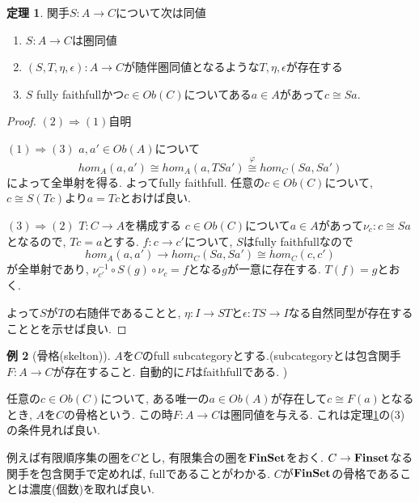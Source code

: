 \documentclass[dvipdfmx,a4paper,11pt]{article}
\theoremstyle{definition}
\newtheorem{thm}{定理}
\newtheorem{exa}[thm]{例}
\begin{document}
 \begin{tcolorbox}
 [colback = white, colframe = green!35!black, fonttitle = \bfseries,breakable = true]
\begin{thm}
\label{thm-adjoint-equiv}
関手$S : A \to C$について次は同値
\begin{enumerate}
\item $S : A \to C$は圏同値
\item $(S,T,\eta,\epsilon): A\to C$が随伴圏同値となるような$T,\eta,\epsilon$が存在する
\item $S$ fully faithfullかつ$c \in Ob(C)$についてある$a \in A$があって$c \cong Sa$.
\end{enumerate}
\end{thm}
\end{tcolorbox}
\begin{proof}
$(2) \Rightarrow (1)$自明

$(1) \Rightarrow (3)$
$a, a' \in Ob(A)$について
$$
hom_{A}(a, a') \cong hom_{A}(a ,TSa') \overset{\varphi}{\cong} hom_{C}(Sa, Sa') 
$$
によって全単射を得る. よってfully faithfull.
任意の$c \in Ob(C)$について, $c \cong S(Tc)$より$a=Tc$とおけば良い.


$(3) \Rightarrow (2)$
$T : C \to A$を構成する
$c \in Ob(C)$について$a \in A$があって$\nu_c : c \cong Sa$となるので, $Tc = a$とする.
$f  : c \to c'$について, $S$はfully faithfullなので
$$
hom_{A}(a,a') \to hom_{C}(Sa, Sa') \cong hom_{C}(c, c')
$$
が全単射であり, $\nu_{c'}^{-1}\circ S(g) \circ \nu_{c}=f$となる$g$が一意に存在する.
$T(f) = g$とおく.

よって$S$が$T$の右随伴であることと, $\eta : I \to ST$と$\epsilon : TS \to I$なる自然同型が存在することとを示せば良い.
\end{proof}

\begin{exa}[骨格(skelton)]
$A$を$C$のfull subcategoryとする.(subcategoryとは包含関手 $F : A \to C$が存在すること. 自動的に$F$はfaithfullである. )

任意の$c \in Ob(C)$について, ある唯一の$a \in Ob(A)$が存在して$c \cong F(a)$となるとき, $A$を$C$の骨格という. 
この時$F : A \to C$は圏同値を与える.
これは定理\ref{thm-adjoint-equiv}の(3)の条件見れば良い. 

例えば有限順序集の圏を$C$とし, 有限集合の圏を${\bf FinSet}$をおく.
$C \to {\bf Finset }$なる関手を包含関手で定めれば, fullであることがわかる.
$C$が${\bf FinSet}$の骨格であることは濃度(個数)を取れば良い. 
\end{exa}
\end{document}
